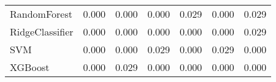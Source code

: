 \begin{tabular}{lllllll}
                   RandomForest &     0.000 &                     0.000 &                 0.000 &                  0.029 &                                   0.000 &    0.029 \\
                RidgeClassifier &     0.000 &                     0.000 &                 0.000 &                  0.000 &                                   0.000 &    0.029 \\
                            SVM &     0.000 &                     0.000 &                 0.029 &                  0.000 &                                   0.029 &    0.000 \\
                        XGBoost &     0.000 &                     0.029 &                 0.000 &                  0.000 &                                   0.000 &    0.000 \\
\bottomrule
\end{tabular}
